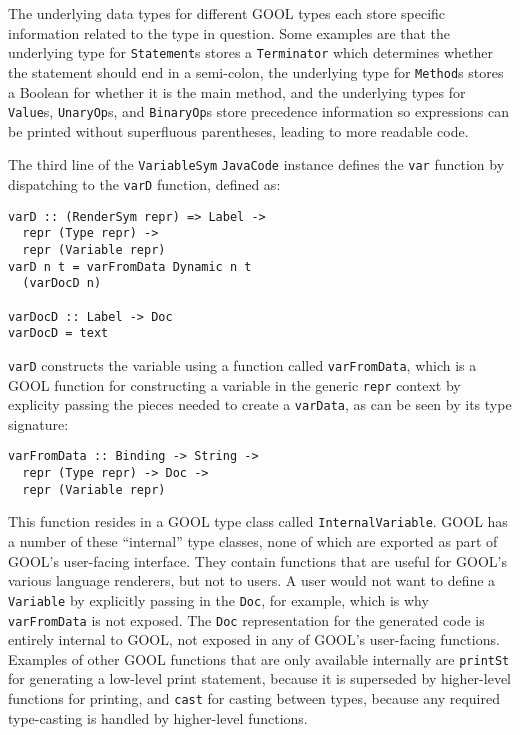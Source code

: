 \documentclass[sigplan,review,anonymous]{acmart}
\begin{document}
The underlying data types for different GOOL types each store specific 
information related to the type in question. Some examples are that the 
underlying type for \verb|Statement|s stores a \verb|Terminator| which 
determines whether the statement should end in a semi-colon, the underlying 
type for \verb|Method|s stores a Boolean for whether it is the main method, and 
the underlying types for \verb|Value|s, \verb|UnaryOp|s, and \verb|BinaryOp|s 
store precedence information so expressions can be printed without superfluous 
parentheses, leading to more readable code.

The third line of the \verb|VariableSym| \verb|JavaCode| instance defines the 
\verb|var| function by dispatching to the \verb|varD| function, defined as:
\begin{lstlisting}
varD :: (RenderSym repr) => Label -> 
  repr (Type repr) -> 
  repr (Variable repr)
varD n t = varFromData Dynamic n t 
  (varDocD n)

varDocD :: Label -> Doc
varDocD = text
\end{lstlisting}
\verb|varD| constructs the variable using a function called \verb|varFromData|, 
which is a GOOL function for constructing a variable in the generic \verb|repr| 
context by explicity passing the pieces needed to create a \verb|varData|, as 
can be seen by its type signature:
\begin{lstlisting}
varFromData :: Binding -> String -> 
  repr (Type repr) -> Doc -> 
  repr (Variable repr)
\end{lstlisting}
This function resides in a GOOL type class called \verb|InternalVariable|. GOOL 
has a number of these ``internal'' type classes, none of which are exported as 
part of GOOL's user-facing interface. They contain functions that are useful 
for GOOL's various language renderers, but not to users. A user would not want 
to define a \verb|Variable| by explicitly passing in the \verb|Doc|, for 
example, which is why \verb|varFromData| is not exposed. The \verb|Doc| 
representation for the generated code is entirely internal to GOOL, not exposed 
in any of GOOL's user-facing functions. Examples of other GOOL functions that 
are only available internally are \verb|printSt| for generating a low-level 
print statement, because it is superseded by higher-level functions for 
printing, and \verb|cast| for casting between types, because any required 
type-casting is handled by higher-level functions.
\end{document}
